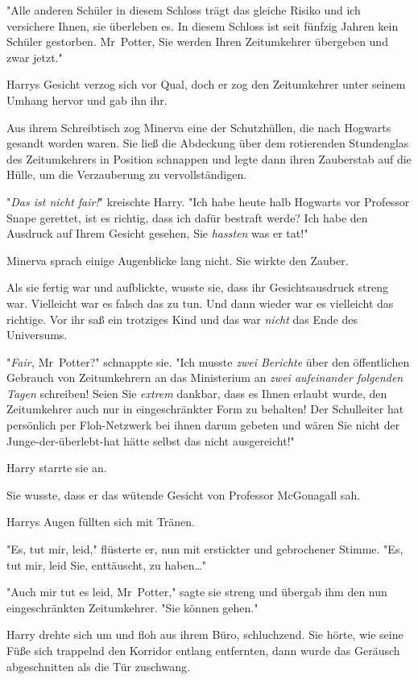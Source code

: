 {"Alle anderen Schüler in diesem Schloss trägt das gleiche Risiko und ich versichere Ihnen, sie überleben es. In diesem Schloss ist seit fünfzig Jahren kein Schüler gestorben. Mr~Potter, Sie werden Ihren Zeitumkehrer übergeben und zwar jetzt."

Harrys Gesicht verzog sich vor Qual, doch er zog den Zeitumkehrer unter seinem Umhang hervor und gab ihn ihr.

Aus ihrem Schreibtisch zog Minerva eine der Schutzhüllen, die nach Hogwarts gesandt worden waren. Sie ließ die Abdeckung über dem rotierenden Stundenglas des Zeitumkehrers in Position schnappen und legte dann ihren Zauberstab auf die Hülle, um die Verzauberung zu vervollständigen.

"\emph{Das ist nicht fair!}" kreischte Harry. "Ich habe heute halb Hogwarts vor Professor Snape gerettet, ist es richtig, dass ich dafür bestraft werde? Ich habe den Ausdruck auf Ihrem Gesicht gesehen, Sie \emph{hassten} was er tat!"

Minerva sprach einige Augenblicke lang nicht. Sie wirkte den Zauber.

Als sie fertig war und aufblickte, wusste sie, dass ihr Gesichtsausdruck streng war. Vielleicht war es falsch das zu tun. Und dann wieder war es vielleicht das richtige. Vor ihr saß ein trotziges Kind und das war \emph{nicht} das Ende des Universums.

"\emph{Fair,} Mr~Potter?" schnappte sie. "Ich musste \emph{zwei Berichte} über den öffentlichen Gebrauch von Zeitumkehrern an das Ministerium an \emph{zwei aufeinander folgenden Tagen} schreiben! Seien Sie \emph{extrem} dankbar, dass es Ihnen erlaubt wurde, den Zeitumkehrer auch nur in eingeschränkter Form zu behalten! Der Schulleiter hat persönlich per Floh-Netzwerk bei ihnen darum gebeten und wären Sie nicht der Junge-der-überlebt-hat hätte selbst das nicht ausgereicht!"

Harry starrte sie an.

Sie wusste, dass er das wütende Gesicht von Professor McGonagall sah.

Harrys Augen füllten sich mit Tränen.

"Es, tut mir, leid," flüsterte er, nun mit erstickter und gebrochener Stimme. "Es, tut mir, leid Sie, enttäuscht, zu haben…"

"Auch mir tut es leid, Mr~Potter," sagte sie streng und übergab ihm den nun eingeschränkten Zeitumkehrer. "Sie können gehen."

Harry drehte sich um und floh aus ihrem Büro, schluchzend. Sie hörte, wie seine Füße sich trappelnd den Korridor entlang entfernten, dann wurde das Geräusch abgeschnitten als die Tür zuschwang.

}
